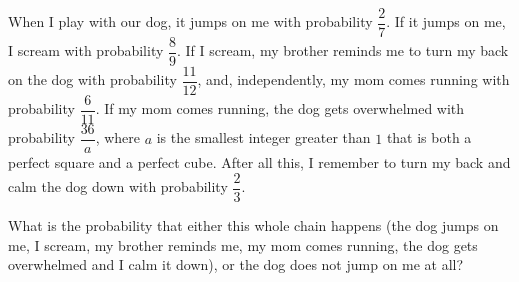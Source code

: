 When I play with our dog, it jumps on me with probability $\dfrac27$. If it jumps on me, I scream with probability $\dfrac89$. If I scream, my brother reminds me to turn my back on the dog with probability $\dfrac{11}{12}$, and, independently, my mom comes running with probability $\dfrac{6}{11}$. If my mom comes running, the dog gets overwhelmed with probability $\dfrac{36}{a}$, where $a$ is the smallest integer greater than $1$ that is both a perfect square and a perfect cube. After all this, I remember to turn my back and calm the dog down with probability $\dfrac23$.

What is the probability that either this whole chain happens (the dog jumps on me, I scream, my brother reminds me, my mom comes running, the dog gets overwhelmed and I calm it down), or the dog does not jump on me at all?
